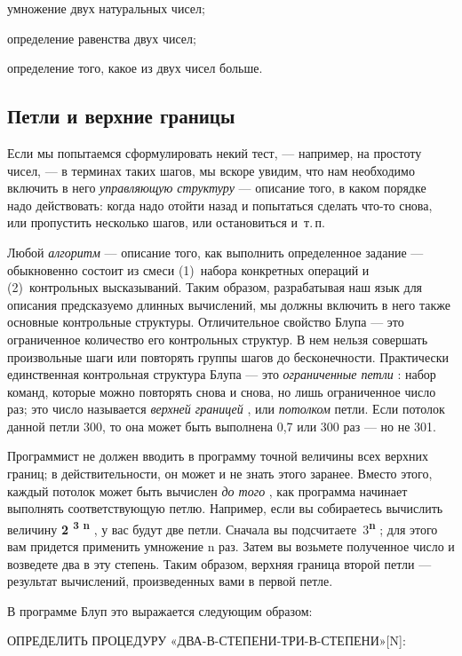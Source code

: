 \documentclass[../main.tex]{subfiles}
\begin{document}
умножение двух натуральных чисел;

определение равенства двух чисел;

определение того, какое из двух чисел больше.


\subsection{Петли и верхние границы}

Если мы попытаемся сформулировать некий тест, --- например, на простоту чисел, --- в терминах таких шагов, мы вскоре увидим, что нам необходимо включить в него \emph{управляющую структуру} --- описание того, в каком порядке надо действовать: когда надо отойти назад и попытаться сделать что-то снова, или пропустить несколько шагов, или остановиться и~т.\,п.

Любой \emph{алгоритм} --- описание того, как выполнить определенное задание --- обыкновенно состоит из смеси (1)~набора конкретных операций и (2)~контрольных высказываний. Таким образом, разрабатывая наш язык для описания предсказуемо длинных вычислений, мы должны включить в него также основные контрольные структуры. Отличительное свойство Блупа --- это ограниченное количество его контрольных структур. В нем нельзя совершать произвольные шаги или повторять группы шагов до бесконечности. Практически единственная контрольная структура Блупа --- это \emph{ограниченные петли} : набор команд, которые можно повторять снова и снова, но лишь ограниченное число раз; это число называется \emph{верхней границей} , или \emph{потолком} петли. Если потолок данной петли 300, то она может быть выполнена 0,7 или 300 раз --- но не 301.

Программист не должен вводить в программу точной величины всех верхних границ; в действительности, он может и не знать этого заранее. Вместо этого, каждый потолок может быть вычислен \emph{до того} , как программа начинает выполнять соответствующую петлю. Например, если вы собираетесь вычислить величину \textbf{2 \textsuperscript{3 n}} , у вас будут две петли. Сначала вы подсчитаете~3\textbf{\textsuperscript{n}} ; для этого вам придется применить умножение n раз. Затем вы возьмете полученное число и возведете два в эту степень. Таким образом, верхняя граница второй петли --- результат вычислений, произведенных вами в первой петле.

В программе Блуп это выражается следующим образом:

ОПРЕДЕЛИТЬ ПРОЦЕДУРУ «ДВА-В-СТЕПЕНИ-ТРИ-В-СТЕПЕНИ»{[}N{]}:
\end{document}

